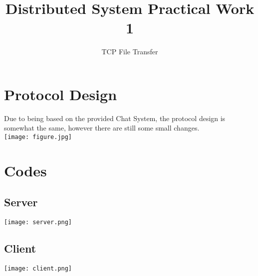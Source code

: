 \documentclass[12pt]{article}
\title{Distributed System Practical Work 1}
\author{TCP File Transfer}
\begin{document}
\maketitle

\tableofcontents
\pagebreak

\section{Protocol Design}
Due to being based on the provided Chat System, the protocol design is somewhat the same, however there are still some small changes.\\
\texttt{[image: figure.jpg]}

\section{Codes}
\subsection{Server}
\texttt{[image: server.png]}

\subsection{Client}
\texttt{[image: client.png]}
\end{document}
